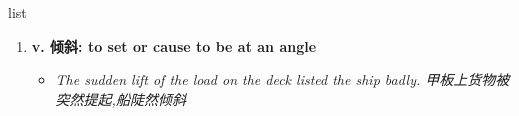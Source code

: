 
\begin{frame}
{\huge list}
\begin{center}
\begin{enumerate}\Large
  \item \textbf{v. 倾斜: to set or cause to be at an angle}
  \begin{itemize}
    \item \em{\Large{The sudden lift of the load on the deck listed the ship badly. 甲板上货物被突然提起,船陡然倾斜}}
  \end{itemize}
\end{enumerate}
\end{center}
\end{frame}

